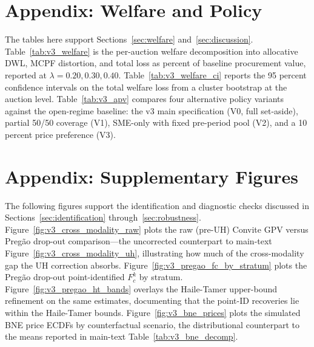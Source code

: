 







\section{Appendix: Welfare and Policy}\label{app:welfare}

The tables here support Sections~\ref{sec:welfare} and~\ref{sec:discussion}. Table~\ref{tab:v3_welfare} is the per-auction welfare decomposition into allocative DWL, MCPF distortion, and total loss as percent of baseline procurement value, reported at $\lambda = 0.20, 0.30, 0.40$. Table~\ref{tab:v3_welfare_ci} reports the 95 percent confidence intervals on the total welfare loss from a cluster bootstrap at the auction level. Table~\ref{tab:v3_apv} compares four alternative policy variants against the open-regime baseline: the v3 main specification (V0, full set-aside), partial 50/50 coverage (V1), SME-only with fixed pre-period pool (V2), and a 10 percent price preference (V3).





\section{Appendix: Supplementary Figures}\label{app:figures}

The following figures support the identification and diagnostic checks discussed in Sections~\ref{sec:identification} through~\ref{sec:robustness}. Figure~\ref{fig:v3_cross_modality_raw} plots the raw (pre-UH) Convite GPV versus Preg\~ao drop-out comparison---the uncorrected counterpart to main-text Figure~\ref{fig:v3_cross_modality_uh}, illustrating how much of the cross-modality gap the UH correction absorbs. Figure~\ref{fig:v3_pregao_fc_by_stratum} plots the Preg\~ao drop-out point-identified $F_c^k$ by stratum. Figure~\ref{fig:v3_pregao_ht_bands} overlays the Haile-Tamer upper-bound refinement on the same estimates, documenting that the point-ID recoveries lie within the Haile-Tamer bounds. Figure~\ref{fig:v3_bne_prices} plots the simulated BNE price ECDFs by counterfactual scenario, the distributional counterpart to the means reported in main-text Table~\ref{tab:v3_bne_decomp}.

